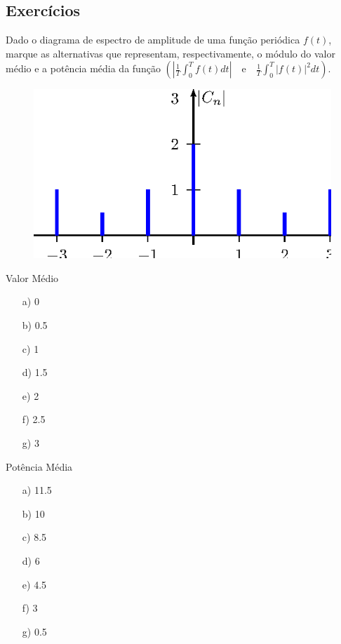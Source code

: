 \subsection*{Exercícios}
\begin{exer}Dado o diagrama de espectro de amplitude de uma função periódica $f(t)$, marque as alternativas que representam, respectivamente, o módulo do valor médio e a potência média da função $\left(\left|\frac{1}{T}\int_0^Tf(t)dt\right|\quad\text{e}\quad \frac{1}{T}\int_0^T|f(t)|^2dt\right)$.
\begin{figure}[!ht]
\begin{center}
\includegraphics{cap_propriedades_series/pics/figura_4}\end{center}
\end{figure}

\begin{minipage}{8cm}
{Valor Médio}
 \begin{itemize}
 \item[a)] 0
 \item[b)] 0.5
 \item[c)] 1
 \item[d)] 1.5
 \item[e)] 2 %
 \item[f)] 2.5
 \item[g)] 3
 \end{itemize}
\end{minipage}
\begin{minipage}{8cm}
{Potência Média}
 \begin{itemize}
\item[a)]  11.5
 \item[b)] 10
 \item[c)] 8.5 %
 \item[d)] 6
 \item[e)] 4.5
 \item[f)] 3
 \item[g)] 0.5
 \end{itemize}
\end{minipage}
\end{exer}
